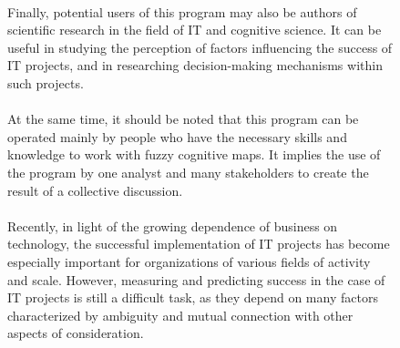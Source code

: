 \documentclass{article}
\begin{document}
\begin{figure}[!t]
\begin{minipage}{0.49\textwidth}
            ~\\
            Finally, potential users of this program may also be authors of scientific research in the field of IT and cognitive science. It can be useful in studying the perception of factors influencing the success of IT projects, and in researching decision-making mechanisms within such projects.\\
            ~\\
            At the same time, it should be noted that this program can be operated mainly by people who have the necessary skills and knowledge to work with fuzzy cognitive maps. It implies the use of the program by one analyst and many stakeholders to create the result of a collective discussion.\\
            ~\\
            Recently, in light of the growing dependence of business on technology, the successful implementation of IT projects has become especially important for organizations of various fields of activity and scale. However, measuring and predicting success in the case of IT projects is still a difficult task, as they depend on many factors characterized by ambiguity and mutual connection with other aspects of consideration.\\
            ~\\
            ~\\
            ~\\
            ~\\
            ~\\
            ~\\
            ~\\
            ~\\
            ~\\
            ~\\
            ~\\
            ~\\
            ~\\
            ~\\
            ~\\
            ~\\
            ~\\
            ~\\
            ~\\
            ~\\
            ~\\
            ~\\
            ~\\

\end{minipage}
\end{figure}
\end{document}

